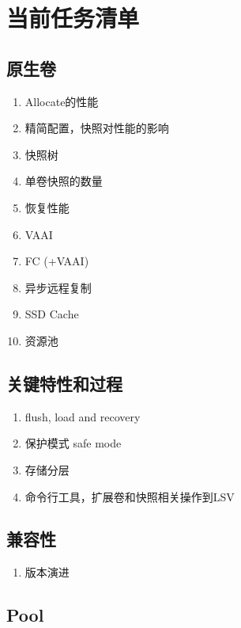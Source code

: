\chapter{当前任务清单}

\section{原生卷}

\begin{tcolorbox}
\begin{enumerate}
    \item Allocate的性能
    \item 精简配置，快照对性能的影响
    \item 快照树
    \item 单卷快照的数量
    \item 恢复性能
    \item VAAI
    \item FC (+VAAI)
    \item 异步远程复制
    \item SSD Cache
    \item 资源池
\end{enumerate}
\end{tcolorbox}

\section{关键特性和过程}

\begin{enumerate}
    \item flush, load and recovery
    \item 保护模式 safe mode
    \item 存储分层
    \item 命令行工具，扩展卷和快照相关操作到LSV
\end{enumerate}

\section{兼容性}

\begin{enumerate}
    \item 版本演进
\end{enumerate}

\section{Pool}

